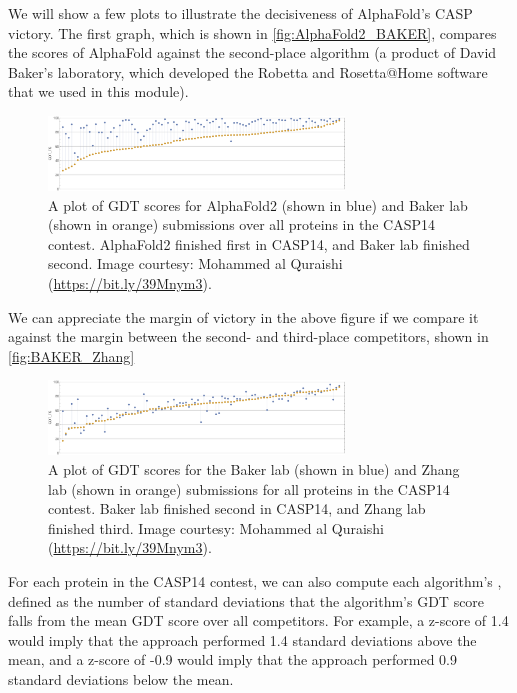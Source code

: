 {{We will show a few plots to illustrate the decisiveness of AlphaFold's CASP victory. The first graph, which is shown in \autoref{fig:AlphaFold2_BAKER}, compares the scores of AlphaFold against the second-place algorithm (a product of David Baker's laboratory, which developed the Robetta and Rosetta@Home software that we used in this module).

\begin{figure}[h]
	\centering
	\mySfFamily
	\includegraphics[width = 0.7\textwidth]{../images/AlphaFold2_BAKER.png}
	\caption{A plot of GDT scores for AlphaFold2 (shown in blue) and Baker lab (shown in orange) submissions over all proteins in the CASP14 contest. AlphaFold2 finished first in CASP14, and Baker lab finished second. Image courtesy: Mohammed al Quraishi (\url{https://bit.ly/39Mnym3}).}
	\label{fig:AlphaFold2_BAKER}
\end{figure}

We can appreciate the margin of victory in the above figure if we compare it against the margin between the second- and third-place competitors, shown in \autoref{fig:BAKER_Zhang}

\begin{figure}[h]
	\centering
	\mySfFamily
	\includegraphics[width = 0.7\textwidth]{../images/BAKER_Zhang.png}
	\caption{A plot of GDT scores for the Baker lab (shown in blue) and Zhang lab (shown in orange) submissions for all proteins in the CASP14 contest. Baker lab finished second in CASP14, and Zhang lab finished third. Image courtesy: Mohammed al Quraishi (\url{https://bit.ly/39Mnym3}).}
	\label{fig:BAKER_Zhang}
\end{figure}

For each protein in the CASP14 contest, we can also compute each algorithm's , defined as the number of standard deviations that the algorithm's GDT score falls from the mean GDT score over all competitors. For example, a z-score of 1.4 would imply that the approach performed 1.4 standard deviations above the mean, and a z-score of -0.9 would imply that the approach performed 0.9 standard deviations below the mean.

}}
